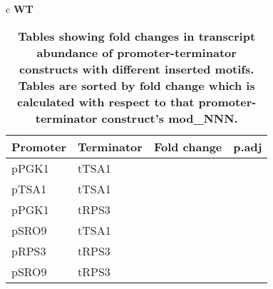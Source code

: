 \documentclass[../main.tex]{subfiles}
\begin{document}
\begin{table}[ph!]
{\begin{tabular}{ c }
 \textbf{WT} \\
\begin{tabularx}{0.8\textwidth} { 
  | >{\centering\arraybackslash}X 
  | >{\centering\arraybackslash}X  
  | >{\centering\arraybackslash}X
  | >{\centering\arraybackslash}X | }
\hline
\textbf{Promoter} & \textbf{Terminator} & \textbf{Fold change} & \textbf{p.adj}\\
\hline
pPGK1 & tTSA1 & 0.7338775 & 0.130\\
\hline
pTSA1 & tTSA1 & 0.7371346 & 0.110\\
\hline
pPGK1 & tRPS3 & 0.9530783 & 0.830\\
\hline
pSRO9 & tTSA1 & 1.0705360 & 0.620\\
\hline
pRPS3 & tRPS3 & 1.3474065 & 0.033\\
\hline
pSRO9 & tRPS3 & 1.4012037 & 0.093\\
\hline
\end{tabularx}
\end{tabular}}\endgroup{}\caption[Tables showing fold changes in transcript abundance of promoter-terminator constructs with different inserted motifs.]{\textbf{Tables showing fold changes in transcript abundance of promoter-terminator constructs with different inserted motifs. Tables are sorted by fold change which is calculated with respect to that promoter-terminator construct's mod\_NNN.}}\label{tab:insertion-construct-ttest}\end{table}
\end{document}
